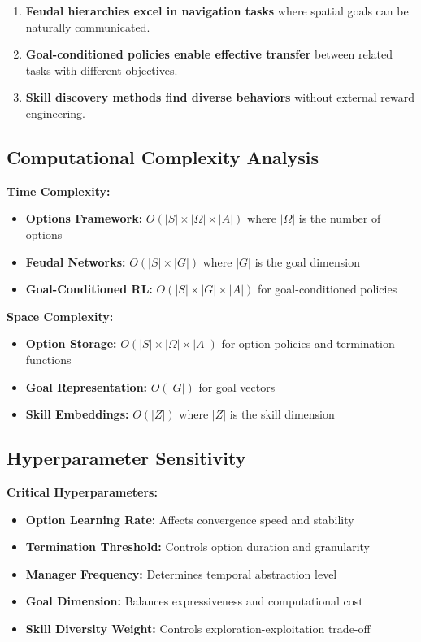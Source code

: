 \documentclass[12pt]{article}
\begin{document}
{{\begin{enumerate}
    \item \textbf{Feudal hierarchies excel in navigation tasks} where spatial goals can be naturally communicated.
    
    \item \textbf{Goal-conditioned policies enable effective transfer} between related tasks with different objectives.
    
    \item \textbf{Skill discovery methods find diverse behaviors} without external reward engineering.
\end{enumerate}

\subsection{Computational Complexity Analysis}

\textbf{Time Complexity:}
\begin{itemize}
    \item \textbf{Options Framework:} $O(|S| \times |\Omega| \times |A|)$ where $|\Omega|$ is the number of options
    \item \textbf{Feudal Networks:} $O(|S| \times |G|)$ where $|G|$ is the goal dimension
    \item \textbf{Goal-Conditioned RL:} $O(|S| \times |G| \times |A|)$ for goal-conditioned policies
\end{itemize}

\textbf{Space Complexity:}
\begin{itemize}
    \item \textbf{Option Storage:} $O(|S| \times |\Omega| \times |A|)$ for option policies and termination functions
    \item \textbf{Goal Representation:} $O(|G|)$ for goal vectors
    \item \textbf{Skill Embeddings:} $O(|Z|)$ where $|Z|$ is the skill dimension
\end{itemize}

\subsection{Hyperparameter Sensitivity}

\textbf{Critical Hyperparameters:}
\begin{itemize}
    \item \textbf{Option Learning Rate:} Affects convergence speed and stability
    \item \textbf{Termination Threshold:} Controls option duration and granularity
    \item \textbf{Manager Frequency:} Determines temporal abstraction level
    \item \textbf{Goal Dimension:} Balances expressiveness and computational cost
    \item \textbf{Skill Diversity Weight:} Controls exploration-exploitation trade-off
\end{itemize}

}}
\end{document}
